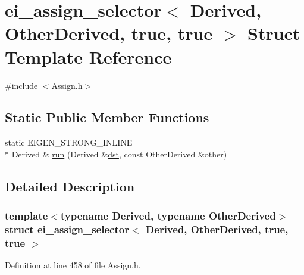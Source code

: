 \hypertarget{structei__assign__selector_3_01_derived_00_01_other_derived_00_01true_00_01true_01_4}{\section{ei\-\_\-assign\-\_\-selector$<$ Derived, Other\-Derived, true, true $>$ Struct Template Reference}
\label{structei__assign__selector_3_01_derived_00_01_other_derived_00_01true_00_01true_01_4}
}


{\ttfamily \#include $<$Assign.\-h$>$}

\subsection*{Static Public Member Functions}
\begin{DoxyCompactItemize}
\item 
static E\-I\-G\-E\-N\-\_\-\-S\-T\-R\-O\-N\-G\-\_\-\-I\-N\-L\-I\-N\-E \\*
Derived \& \hyperlink{structei__assign__selector_3_01_derived_00_01_other_derived_00_01true_00_01true_01_4_a49ce6b9fe82b35e7d5929e6172b4381e}{run} (Derived \&\hyperlink{glext_8h_a92034251bfd455d524a9b5610cddba00}{dst}, const Other\-Derived \&other)
\end{DoxyCompactItemize}


\subsection{Detailed Description}
\subsubsection*{template$<$typename Derived, typename Other\-Derived$>$struct ei\-\_\-assign\-\_\-selector$<$ Derived, Other\-Derived, true, true $>$}



Definition at line 458 of file Assign.\-h.



